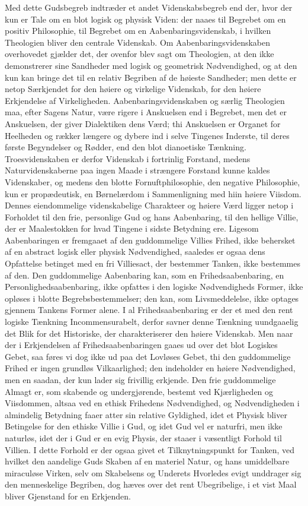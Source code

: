 \documentclass[12pt,a4paper]{book}
\newcommand{\opage}[1]{\marginnote{\footnotesize\textit{[#1]}}}
\begin{document}
Med dette Gudsbegreb indtræder et andet Videnskabsbegreb end der, hvor der kun er
Tale om en blot logisk og physisk Viden: der naaes til Begrebet om en positiv
Philosophie, til Begrebet om en Aabenbaringsvidenskab, i hvilken Theologien
bliver den centrale Videnskab. Om Aabenbaringsvidenskaben overhovedet gjælder det,
der ovenfor blev sagt om Theologien, at den ikke demonstrerer sine Sandheder med
logisk og geometrisk Nødvendighed, og at den kun kan bringe det til en relativ
Begriben af de høieste Sandheder; men dette er netop Særkjendet for den høiere og
virkelige Videnskab, for den høiere Erkjendelse af Virkeligheden.
Aabenbaringsvidenskaben og særlig Theologien maa, efter Sagens Natur, være rigere
i Anskuelsen end i Begrebet, men det er Anskuelsen, der giver Dialektiken dens
Værd; thi Anskuelsen er Organet for Heelheden og rækker længere og dybere ind i
selve Tingenes Inderste, til deres første Begyndelser og Rødder, end den blot
dianoetiske Tænkning. Troesvidenskaben er derfor Videnskab i fortrinlig Forstand,
medens Naturvidenskaberne paa ingen Maade i strængere Forstand kunne kaldes
Videnskaber, og medens den blotte Fornuftphilosophie, den negative Philosophie,
kun er propædeutisk, en Børnelærdom i Sammenligning med hiin høiere Viisdom.
Dennes eiendommelige videnskabelige Charakteer og høiere Værd ligger netop i
Forholdet til den frie, personlige Gud og hans Aabenbaring, til den hellige
Villie, der er Maalestokken for hvad Tingene i sidste Betydning ere. Ligesom
Aabenbaringen er fremgaaet af den guddommelige Villies Frihed, ikke behersket af
en abstract logisk eller physisk Nødvendighed, saaledes er ogsaa dens Opfattelse
betinget med en fri Villiesact, der bestemmer Tanken, ikke bestemmes af den. Den
guddommelige Aabenbaring kan, som en Frihedsaabenbaring, en
Personlighedsaabenbaring, ikke opfattes i den logiske Nødvendigheds Former, ikke
opløses i blotte Begrebsbestemmelser; den kan, som Livsmeddelelse, ikke optages
gjennem Tankens Former \opage{48}alene. I al Frihedsaabenbaring er der et med den rent
logiske Tænkning Incommensurabelt, derfor savner denne Tænkning uundgaaelig det
Blik for det Historiske, der charakteriserer den høiere Videnskab. Men naar der i
Erkjendelsen af Frihedsaabenbaringen gaaes ud over det blot Logiskes Gebet, saa
føres vi dog ikke ud paa det Lovløses Gebet, thi den guddommelige Frihed er ingen
grundløs Vilkaarlighed; den indeholder en høiere Nødvendighed, men en saadan, der
kun lader sig frivillig erkjende. Den frie guddommelige Almagt er, som skabende og
undergjørende, bestemt ved Kjærligheden og Viisdommen, altsaa ved en ethisk
Frihedens Nødvendighed, og Nødvendigheden i almindelig Betydning faaer atter sin
relative Gyldighed, idet et Physisk bliver Betingelse for den ethiske Villie i
Gud, og idet Gud vel er naturfri, men ikke naturløs, idet der i Gud er en evig
Physis, der staaer i væsentligt Forhold til Villien. I dette Forhold er der ogsaa
givet et Tilknytningspunkt for Tanken, ved hvilket den aandelige Guds Skaben af en
materiel Natur, og hans umiddelbare miraculøse Virken, selv om Skabelsens og
Underets Hvorledes evigt unddrager sig den menneskelige Begriben, dog hæves over
det rent Ubegribelige, i et vist Maal bliver Gjenstand for en Erkjenden.
\end{document}
